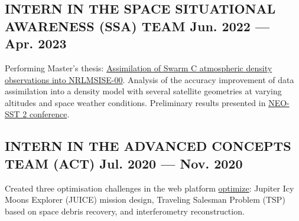 \documentclass[letter,10pt]{article}
\begin{document}
\subsection{{INTERN IN THE SPACE SITUATIONAL AWARENESS (SSA) TEAM \hfill Jun. 2022  --- Apr. 2023}}
\begin{zitemize}
\item Performing Master's thesis: \href{https://repository.tudelft.nl/islandora/object/uuid:f472201e-0e32-4b9e-8aa3-04521908396a}{Assimilation of Swarm C atmospheric density observations into NRLMSISE-00}. Analysis of the accuracy improvement of data assimilation into a density model with several satellite geometries at varying altitudes and space weather conditions. Preliminary results presented in \href{https://conference.sdo.esoc.esa.int/proceedings/neosst2/paper/90/NEOSST2-paper90.pdf}{NEO-SST 2 conference}.
\end{zitemize}
\subsection{{INTERN IN THE ADVANCED CONCEPTS TEAM (ACT) \hfill Jul. 2020  --- Nov. 2020}}
\begin{zitemize}
\item Created three optimisation challenges in the web platform \href{https://optimize.esa.int/}{optimize}: Jupiter Icy Moons Explorer (JUICE) mission design, Traveling Salesman Problem (TSP) based on space debris recovery, and interferometry reconstruction.
\end{zitemize}

\end{document}

